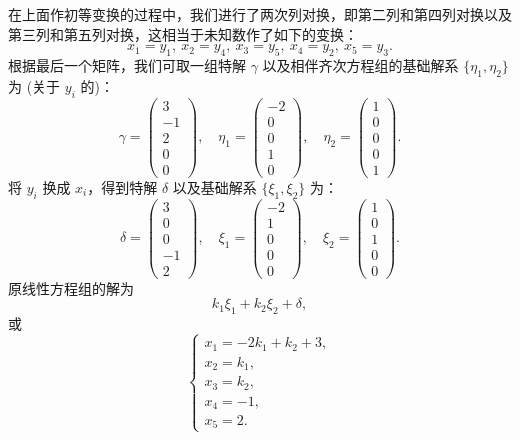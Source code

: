 \documentclass[UTF8, 12pt, fontset=fandol, oneside]{ctexart}
\begin{document}
在上面作初等变换的过程中，我们进行了两次列对换，即第二列和第四列对换以及第三列和第五列对换，这相当于未知数作了如下的变换：
\[
x_1=y_1,\ x_2=y_4,\ x_3=y_5,\ x_4=y_2,\ x_5=y_3.
\]
根据最后一个矩阵，我们可取一组特解 $\gamma$ 以及相伴齐次方程组的基础解系 $\{\eta_1,\eta_2\}$ 为 (关于 $y_i$ 的)：
\[
\gamma=\left(\begin{array}{r}
3\\
-1\\
2\\
0\\
0
\end{array}\right),\quad
\eta_1=\left(\begin{array}{r}
-2\\
0\\
0\\
1\\
0
\end{array}\right),\quad
\eta_2=\left(\begin{array}{r}
1\\
0\\
0\\
0\\
1
\end{array}\right).
\]
将 $y_i$ 换成 $x_i$，得到特解 $\delta$ 以及基础解系 $\{\xi_1,\xi_2\}$ 为：
\[
\delta=\left(\begin{array}{r}
3\\
0\\
0\\
-1\\
2
\end{array}\right),\quad
\xi_1=\left(\begin{array}{r}
-2\\
1\\
0\\
0\\
0
\end{array}\right),\quad
\xi_2=\left(\begin{array}{r}
1\\
0\\
1\\
0\\
0
\end{array}\right).
\]
原线性方程组的解为
\[
k_1\xi_1+k_2\xi_2+\delta,
\]
或
\[
\left\{\begin{array}{l}
x_1=-2k_1+k_2+3,\\
x_2=k_1,\\
x_3=k_2,\\
x_4=-1,\\
x_5=2.
\end{array}\right.
\]
\end{document}
